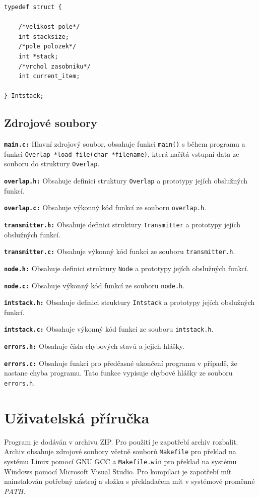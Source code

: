 \documentclass[12pt,a4paper]{article}
\begin{document}
\begin{verbatim}
typedef struct {

    /*velikost pole*/
    int stacksize;
    /*pole polozek*/
    int *stack;
    /*vrchol zasobniku*/
    int current_item;

} Intstack;
\end{verbatim}

\subsection{Zdrojové soubory}
\textbf{\texttt{main.c:}} Hlavní zdrojový soubor, obsahuje funkci \texttt{main()} s během 
programu a funkci \texttt{Overlap *load\_file(char *filename)}, která načítá vstupní data 
ze souboru do struktury \texttt{Overlap}.

\textbf{\texttt{overlap.h:}} Obsahuje definici struktury \texttt{Overlap} a prototypy jejích obslužných funkcí.

\textbf{\texttt{overlap.c:}} Obsahuje výkonný kód funkcí ze souboru \texttt{overlap.h}.

\textbf{\texttt{transmitter.h:}} Obsahuje definici struktury \texttt{Transmitter} a prototypy jejích obslužných funkcí.

\textbf{\texttt{transmitter.c:}} Obsahuje výkonný kód funkcí ze souboru \texttt{transmitter.h}.

\textbf{\texttt{node.h:}} Obsahuje definici struktury \texttt{Node} a prototypy jejích obslužných funkcí.

\textbf{\texttt{node.c:}} Obsahuje výkonný kód funkcí ze souboru \texttt{node.h}.

\textbf{\texttt{intstack.h:}} Obsahuje definici struktury \texttt{Intstack} a prototypy jejích obslužných funkcí.

\textbf{\texttt{intstack.c:}} Obsahuje výkonný kód funkcí ze souboru \texttt{intstack.h}.

\textbf{\texttt{errors.h:}} Obsahuje čísla chybových stavů a jejich hlášky.

\textbf{\texttt{errors.c:}} Obsahuje funkci pro předčasné ukončení programu v případě, že nastane chyba programu. 
Tato funkce vypisuje chybové hlášky ze souboru \texttt{errors.h}.
%
%
\section{Uživatelská příručka}
%
Program je dodáván v archivu ZIP. Pro použití je zapotřebí archiv rozbalit.
 Archiv obsahuje zdrojové soubory včetně 
souborů \texttt{Makefile} pro překlad na systému Linux pomocí GNU GCC a \texttt{Makefile.win} pro překlad na systému 
Windows pomocí Microsoft Visual Studio. Pro kompilaci je zapotřebí mít nainstalován
potřebný nástroj a složku s překladačem mít v systémové proměnné \textit{PATH}.
%
\end{document}
